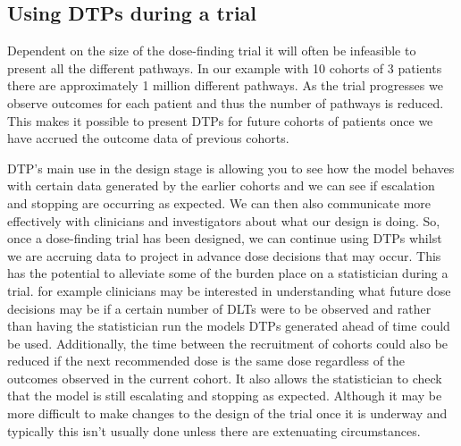 \subsection{Using DTPs during a trial}

Dependent on the size of the dose-finding trial it will often be infeasible to present all the different pathways. In our example with 10 cohorts of 3 patients there are approximately 1 million different pathways. As the trial progresses we observe outcomes for each patient and thus the number of pathways is reduced. This makes it possible to present DTPs for future cohorts of patients once we have accrued the outcome data of previous cohorts. 

DTP's main use in the design stage is allowing you to see how the model behaves with certain data generated by the earlier cohorts and we can see if escalation and stopping are occurring as expected. We can then also communicate more effectively with clinicians and investigators about what our design is doing. So, once a dose-finding trial has been designed, we can continue using DTPs whilst we are accruing data to project in advance dose decisions that may occur. This has the potential to alleviate some of the burden place on a statistician during a trial. for example clinicians may be interested in understanding what future dose decisions may be if a certain number of DLTs were to be observed and rather than having the statistician run the models DTPs generated ahead of time could be used. Additionally, the time between the recruitment of cohorts could also be reduced if the next recommended dose is the same dose regardless of the outcomes observed in the current cohort. It also allows the statistician to check that the model is still escalating and stopping as expected. Although it may be more difficult to make changes to the design of the trial once it is underway and typically this isn't usually done unless there are extenuating circumstances.

